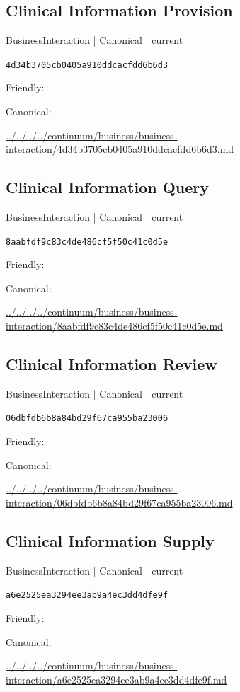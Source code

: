 \documentclass[10pt,a4paper]{article}
\begin{document}
\subsection*{Clinical Information Provision}
{\small BusinessInteraction | Canonical | current}\par
\texttt{4d34b3705cb0405a910ddcacfdd6b6d3}\par
Friendly: \par
Canonical: \par
{\footnotesize\url{../../../../continuum/business/business-interaction/4d34b3705cb0405a910ddcacfdd6b6d3.md}}\par
\subsection*{Clinical Information Query}
{\small BusinessInteraction | Canonical | current}\par
\texttt{8aabfdf9c83c4de486cf5f50c41c0d5e}\par
Friendly: \par
Canonical: \par
{\footnotesize\url{../../../../continuum/business/business-interaction/8aabfdf9c83c4de486cf5f50c41c0d5e.md}}\par
\subsection*{Clinical Information Review}
{\small BusinessInteraction | Canonical | current}\par
\texttt{06dbfdb6b8a84bd29f67ca955ba23006}\par
Friendly: \par
Canonical: \par
{\footnotesize\url{../../../../continuum/business/business-interaction/06dbfdb6b8a84bd29f67ca955ba23006.md}}\par
\subsection*{Clinical Information Supply}
{\small BusinessInteraction | Canonical | current}\par
\texttt{a6e2525ea3294ee3ab9a4ec3dd4dfe9f}\par
Friendly: \par
Canonical: \par
{\footnotesize\url{../../../../continuum/business/business-interaction/a6e2525ea3294ee3ab9a4ec3dd4dfe9f.md}}\par
\end{document}
